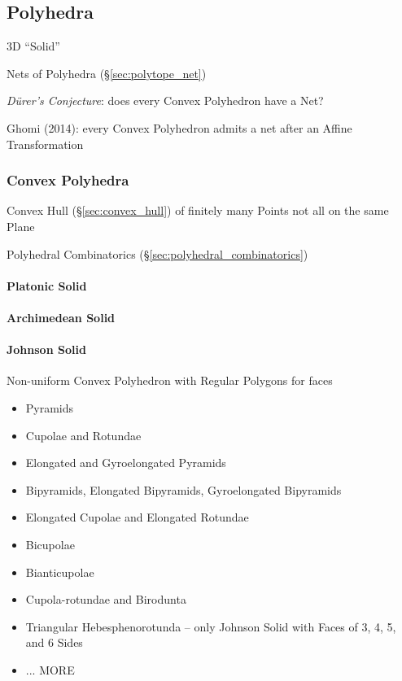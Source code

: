 \subsection{Polyhedra}\label{sec:polyhedra}

3D ``Solid''

Nets of Polyhedra (\S\ref{sec:polytope_net})

\emph{D\"urer's Conjecture}: does every Convex Polyhedron have a Net?

Ghomi (2014): every Convex Polyhedron admits a net after an Affine
Transformation



\subsubsection{Convex Polyhedra}\label{sec:convex_polyhedra}

Convex Hull (\S\ref{sec:convex_hull}) of finitely many Points not all on the
same Plane

\fist Polyhedral Combinatorics (\S\ref{sec:polyhedral_combinatorics})



\paragraph{Platonic Solid}\label{sec:platonic_solid}\hfill

\paragraph{Archimedean Solid}\label{sec:archimedean_solid}\hfill

\paragraph{Johnson Solid}\label{sec:johnson_solid}\hfill

Non-uniform Convex Polyhedron with Regular Polygons for faces

\begin{itemize}
  \item Pyramids
  \item Cupolae and Rotundae
  \item Elongated and Gyroelongated Pyramids
  \item Bipyramids, Elongated Bipyramids, Gyroelongated Bipyramids
  \item Elongated Cupolae and Elongated Rotundae
  \item Bicupolae
  \item Bianticupolae
  \item Cupola-rotundae and Birodunta
  \item Triangular Hebesphenorotunda -- only Johnson Solid with Faces of 3, 4,
    5, and 6 Sides
  \item ... MORE
\end{itemize}




